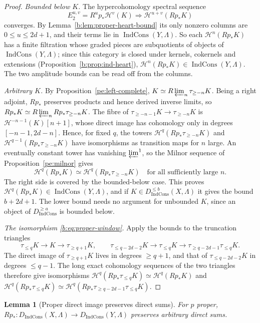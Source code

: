 \documentclass[11pt,a4paper]{article}
\numberwithin{equation}{section}
\newtheorem{lemma}[theorem]{Lemma}
\theoremstyle{definition}
\theoremstyle{remark}
\newcommand{\IndCons}{\operatorname{IndCons}}
\newcommand{\Dic}{D_{\IndCons}}
\begin{document}
\begin{proof}
\emph{Bounded below $K$.} The hypercohomology spectral sequence
\[
 E_2^{u,v}=R^up_*\mathcal H^v(K)\Longrightarrow\mathcal H^{u+v}(Rp_*K)
\]
converges. By Lemma~\ref{b:lem:proper-heart-bound} its only nonzero
columns are $0\leq u\leq2d+1$, and their terms lie in
$\IndCons(Y,\Lambda)$. So each $\mathcal H^n(Rp_*K)$ has a finite
filtration whose graded pieces are subquotients of objects of
$\IndCons(Y,\Lambda)$; since this category is closed under kernels,
cokernels and extensions (Proposition~\ref{b:prop:ind-heart}),
$\mathcal H^n(Rp_*K)\in\IndCons(Y,\Lambda)$. The two amplitude bounds can
be read off from the columns.

\emph{Arbitrary $K$.} By Proposition~\ref{pe:left-complete}, $K\simeq R\varprojlim_n
\tau_{\geq-n}K$. Being a right adjoint, $Rp_*$ preserves products and
hence derived inverse limits, so
$Rp_*K\simeq R\varprojlim_nRp_*\tau_{\geq-n}K$. The fibre of
$\tau_{\geq-n-1}K\to\tau_{\geq-n}K$ is $\mathcal H^{-n-1}(K)[n+1]$, whose
direct image has cohomology only in degrees $[-n-1,2d-n]$. Hence, for
fixed $q$, the towers $\mathcal H^q(Rp_*\tau_{\geq-n}K)$ and
$\mathcal H^{q-1}(Rp_*\tau_{\geq-n}K)$ have isomorphisms as transition
maps for $n$ large. An eventually constant tower has vanishing
$\varprojlim^1$, so the Milnor sequence of Proposition~\ref{pe:milnor} gives
\[
 \mathcal H^q(Rp_*K)\simeq
 \mathcal H^q(Rp_*\tau_{\geq-n}K)\quad\text{for all sufficiently large }n.
\]
The right side is covered by the bounded-below case. This proves
$\mathcal H^q(Rp_*K)\in\IndCons(Y,\Lambda)$, and if $K\in
\Dic^{\leq b}(X,\Lambda)$ it gives the bound $b+2d+1$. The lower bound
needs no argument for unbounded $K$, since an object of
$\Dic^{\geq a}$ is bounded below.

\emph{The isomorphism \eqref{b:eq:proper-window}.} Apply the bounds to
the truncation triangles
\[
 \tau_{\leq q}K\to K\to\tau_{\geq q+1}K,
 \qquad
 \tau_{\leq q-2d-2}K\to\tau_{\leq q}K\to\tau_{\geq q-2d-1}\tau_{\leq q}K.
\]
The direct image of $\tau_{\geq q+1}K$ lives in degrees $\geq q+1$, and
that of $\tau_{\leq q-2d-2}K$ in degrees $\leq q-1$. The long exact
cohomology sequences of the two triangles therefore give isomorphisms
$\mathcal H^q(Rp_*\tau_{\leq q}K)\simeq\mathcal H^q(Rp_*K)$ and
$\mathcal H^q(Rp_*\tau_{\leq q}K)\simeq
\mathcal H^q(Rp_*\tau_{\geq q-2d-1}\tau_{\leq q}K)$.
\end{proof}

\begin{lemma}[Proper direct image preserves direct sums]
\label{b:lem:proper-unbounded-window-b}
For $p$ proper, $Rp_*:\Dic(X,\Lambda)\to\Dic(Y,\Lambda)$ preserves
arbitrary direct sums.
\end{lemma}
\end{document}
